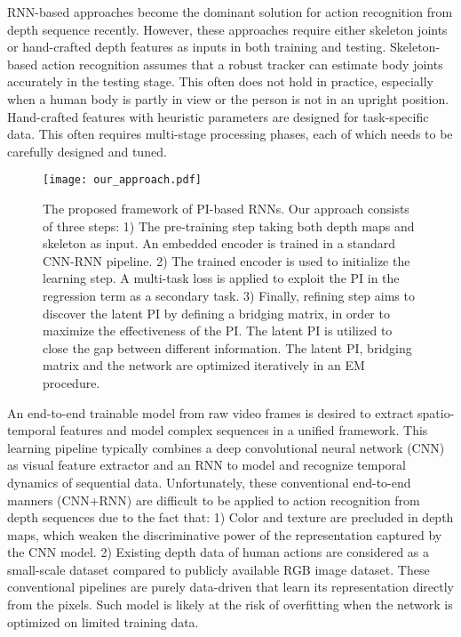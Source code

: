 \documentclass[10pt,twocolumn,letterpaper]{article}
\begin{document}
RNN-based approaches become the dominant solution \cite{wentao_2016,Veeriah_2015_ICCV,Yong_cvpr_2015,Liu2016} for action recognition from depth sequence recently. However, these approaches require either skeleton joints \cite{wentao_2016,Yong_cvpr_2015,Piotr_2016} or hand-crafted depth features \cite{Veeriah_2015_ICCV} as inputs in both training and testing. Skeleton-based action recognition assumes that a robust tracker can estimate body joints accurately in the testing stage. This often does not hold in practice, especially when a human body is partly in view or the person is not in an upright position. Hand-crafted features with heuristic parameters are designed for task-specific data. This often requires multi-stage processing phases, each of which needs to be carefully designed and tuned.

\begin{figure*}[t]
\centering
   \texttt{[image: our\_approach.pdf]}

\caption{The proposed framework of PI-based RNNs. Our approach consists of three steps: 1) The pre-training step taking both depth maps and skeleton as input. An embedded encoder is trained in a standard CNN-RNN pipeline. 2) The trained encoder is used to initialize the learning step. A multi-task loss is applied to exploit the PI in the regression term as a secondary task. 3) Finally, refining step aims to discover the latent PI by defining a bridging matrix, in order to maximize the effectiveness of the PI. The latent PI is utilized to close the gap between different information. The latent PI, bridging matrix and the network are optimized iteratively in an EM procedure.}
\label{fig:our_model}
\end{figure*}

An end-to-end trainable model from raw video frames \cite{lrcn2014} is desired to extract spatio-temporal features and model complex sequences in a unified framework. This learning pipeline typically combines a deep convolutional neural network (CNN) \cite{Alex_nips_2012} as visual feature extractor and an RNN \cite{Graves_2012_book} to model and recognize temporal dynamics of sequential data. Unfortunately, these conventional end-to-end manners (CNN+RNN) are difficult to be applied to action recognition from depth sequences due to the fact that: 1) Color and texture are precluded in depth maps, which weaken the discriminative power of the representation captured by the CNN model. 2) Existing depth data of human actions are considered as a small-scale dataset compared to publicly available RGB image dataset. These conventional pipelines are purely data-driven that learn its representation directly from the pixels. Such model is likely at the risk of overfitting when the network is optimized on limited training data.
\end{document}
